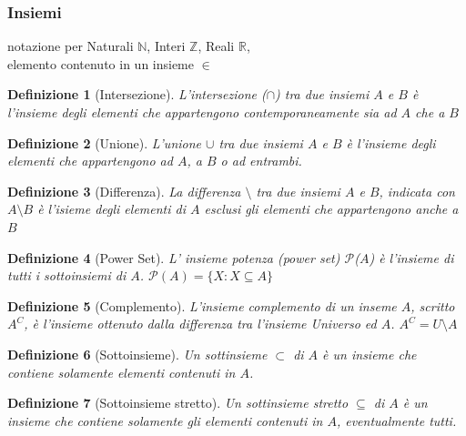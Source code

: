 \documentclass[a4paper]{article}
\newtheorem*{definition}{Definizione}
\begin{document}
\subsubsection{Insiemi}
notazione per Naturali $ \mathbb{N} $, Interi $ \mathbb{Z} $, Reali $ \mathbb{R} $,\\ elemento contenuto in un insieme $ \in $
\newline
\begin{definition}[Intersezione]L'intersezione ($\cap$) tra due insiemi $A$ e $B$ è l'insieme degli elementi che appartengono contemporaneamente sia ad $A$ che a $B$
\end{definition}
\begin{definition}[Unione]L'unione $\cup$ tra due insiemi $A$ e $B$ è l'insieme degli elementi che appartengono ad $A$, a $B$ o ad entrambi.
\end{definition}
\begin{definition}[Differenza]La differenza $\setminus$ tra due insiemi $A$ e $B$, indicata con $A \setminus B$ è l'isieme degli elementi di $A$ esclusi gli elementi che appartengono anche a $B$
\end{definition}
\begin{definition}[Power Set]L' insieme potenza (power set) $\mathcal{P}$($A$) è l'insieme di tutti i sottoinsiemi di $A$. $\mathcal{P}(A)=\{X : X \subseteq A\}$ 
\end{definition}
\begin{definition}[Complemento]L'insieme complemento di un inseme $A$, scritto $A^{C}$, è l'insieme ottenuto dalla differenza tra l'insieme Universo ed $A$. $A^{C} = U \setminus A$
\end{definition}
\begin{definition}[Sottoinsieme]Un sottinsieme $ \subset $ di $A$ è un insieme che contiene solamente elementi contenuti in $A$.
\end{definition}
\begin{definition}[Sottoinsieme stretto]Un sottinsieme stretto $ \subseteq $  di $A$ è un insieme che contiene solamente gli elementi contenuti in $A$, eventualmente tutti.
\end{definition}
\end{document}
